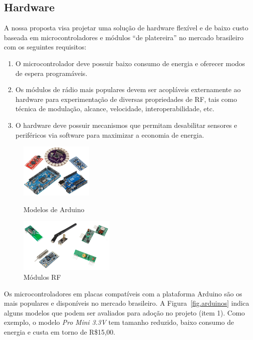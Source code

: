 \documentclass[titlepage,12pt]{article}
\begin{document}
\subsection{Hardware}

A nossa proposta visa projetar uma solução de hardware flexível e de baixo
custo baseada em microcontroladores e módulos ``de platereira'' no mercado
brasileiro com os seguintes requisitos:
%
\begin{enumerate}
\item O microcontrolador deve possuir baixo consumo de energia e oferecer
      modos de espera programáveis.
\item Os módulos de rádio mais populares devem ser acopláveis externamente ao
      hardware para experimentação de diversas propriedades de RF, tais como
      técnica de modulação, alcance, velocidade, interoperabilidade, etc.
\item O hardware deve possuir mecanismos que permitam desabilitar sensores e
      periféricos via software para maximizar a economia de energia.
\end{enumerate}

\begin{figure}
\begin{minipage}{0.50\textwidth}
\includegraphics[height=100px]{arduinos}
\caption{ Modelos de Arduino \label{fig.arduinos} }
\end{minipage}
\begin{minipage}{0.50\textwidth}
\includegraphics[height=100px]{rfs}
\caption{ Módulos RF \label{fig.rfs} }
\end{minipage}
\end{figure}

Os microcontroladores em placas compatíveis com a plataforma Arduino são os
mais populares e disponíveis no mercado brasileiro.
%
A Figura~\ref{fig.arduinos} indica alguns modelos que podem ser avaliados para
adoção no projeto (item 1).
%
Como exemplo, o modelo \emph{Pro Mini 3.3V} tem tamanho reduzido, baixo consumo
de energia e custa em torno de R\$15,00.
\end{document}

